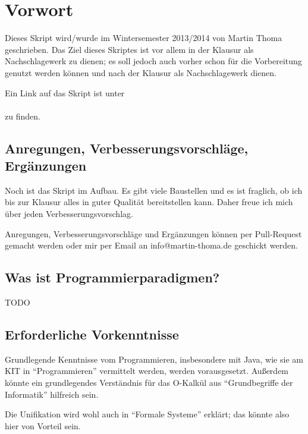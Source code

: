 \chapter*{Vorwort}
Dieses Skript wird/wurde im Wintersemester 2013/2014
von Martin Thoma geschrieben. Das Ziel dieses Skriptes ist vor allem
in der Klausur als Nachschlagewerk zu dienen; es soll jedoch auch
vorher schon für die Vorbereitung genutzt werden können und nach
der Klausur als Nachschlagewerk dienen.

Ein Link auf das Skript ist unter \\
\href{http://martin-thoma.com/programmierparadigmen/}{}\\
zu finden.

\section*{Anregungen, Verbesserungsvorschläge, Ergänzungen}
Noch ist das Skript im Aufbau. Es gibt viele Baustellen und es ist
fraglich, ob ich bis zur Klausur alles in guter Qualität bereitstellen
kann. Daher freue ich mich über jeden Verbesserungsvorschlag.

Anregungen, Verbesserungsvorschläge und Ergänzungen können per
Pull-Request gemacht werden oder mir per Email an info@martin-thoma.de
geschickt werden.

\section*{Was ist Programmierparadigmen?}

TODO

\section*{Erforderliche Vorkenntnisse}
Grundlegende Kenntnisse vom Programmieren, insbesondere mit Java,
wie sie am KIT in \enquote{Programmieren} vermittelt werden, werden
vorausgesetzt. Außerdem könnte ein grundlegendes Verständnis für 
das O-Kalkül aus \enquote{Grundbegriffe der Informatik} hilfreich sein.

Die Unifikation wird wohl auch in \enquote{Formale Systeme}
erklärt; das könnte also hier von Vorteil sein.
